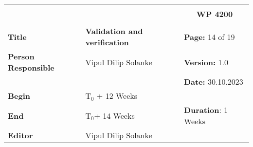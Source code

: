 \begin{table}[!h]
  \begin{center}
    \begin{tabular}{|p{35mm}||p{55mm}|p{50mm}||p{40mm}|}
      \hline
      \multicolumn{3}{|l||}{\textbf{}} & \multicolumn{1}{c|}{}                                                                                                                                                \\
      \multicolumn{3}{|l||}{\textbf{}} & \multicolumn{1}{c|}{\textbf{WP 4200}}                                                                                                                                \\
      \multicolumn{3}{|l||}{\textbf{}} & \multicolumn{1}{c|}{}                                                                                                                                                \\
      \hline\hline
      \textbf{Title}                   & \multicolumn{2}{p{7cm}||}{\textbf{Validation and verification}}
                                       & \textbf{Page:} 14 of 19                                                                                                                                             \\
      \hline
      \textbf{Person Responsible}        & \multicolumn{2}{l||}{Vipul Dilip Solanke}                                                                                                   & \textbf{Version:} 1.0   \\
      \hline
      \multicolumn{3}{|l||}{}          & \textbf{Date:} 30.10.2023                                                                                                                                          \\
      \hline\hline
      \textbf{Begin}                  & \multicolumn{2}{l||}{T$_0$ + 12 Weeks}                                                                                                                &                         \\
      \hline
      \textbf{End}                    & \multicolumn{2}{l||}{T$_0$+ 14 Weeks}                                                                                                        & \textbf{Duration}: 1 Weeks \\
      \hline\hline
      \textbf{Editor}              & \multicolumn{3}{l|}{Vipul Dilip Solanke}                                                                                                                              \\

\end{tabular}
\end{center}
\end{table}
